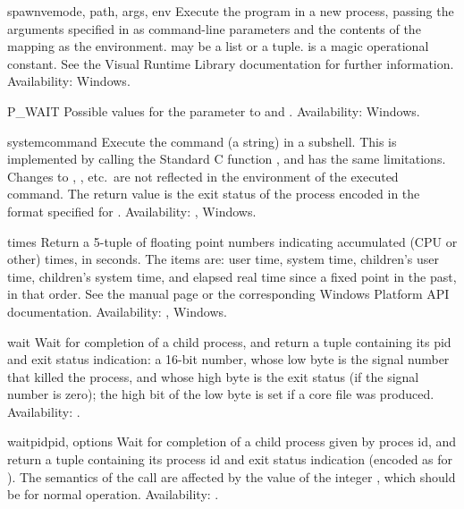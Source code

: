 \begin{funcdesc}{spawnve}{mode, path, args, env}
Execute the program  in a new process, passing the arguments 
specified in  as command-line parameters and the contents of 
the mapping  as the environment.   may be a list or
a tuple.   is a magic operational constant.  See the Visual
\Cpp{} Runtime Library documentation for further information.
Availability: Windows.
\end{funcdesc}

\begin{datadesc}{P_WAIT}
Possible values for the  parameter to 
and .
Availability: Windows.
\end{datadesc}

\begin{funcdesc}{system}{command}
Execute the command (a string) in a subshell.  This is implemented by
calling the Standard C function , and has the
same limitations.  Changes to , ,
etc.\ are not reflected in the environment of the executed command.
The return value is the exit status of the process encoded in the
format specified for .
Availability: \UNIX{}, Windows.
\end{funcdesc}

\begin{funcdesc}{times}{}
Return a 5-tuple of floating point numbers indicating accumulated (CPU
or other)
times, in seconds.  The items are: user time, system time, children's
user time, children's system time, and elapsed real time since a fixed
point in the past, in that order.  See the \UNIX{} manual page
 or the corresponding Windows Platform API
documentation.
Availability: \UNIX{}, Windows.
\end{funcdesc}

\begin{funcdesc}{wait}{}
Wait for completion of a child process, and return a tuple containing
its pid and exit status indication: a 16-bit number, whose low byte is
the signal number that killed the process, and whose high byte is the
exit status (if the signal number is zero); the high bit of the low
byte is set if a core file was produced.
Availability: \UNIX{}.
\end{funcdesc}

\begin{funcdesc}{waitpid}{pid, options}
Wait for completion of a child process given by proces id, and return
a tuple containing its process id and exit status indication (encoded
as for ).  The semantics of the call are affected by
the value of the integer , which should be  for
normal operation.
Availability: \UNIX{}.
\end{funcdesc}

